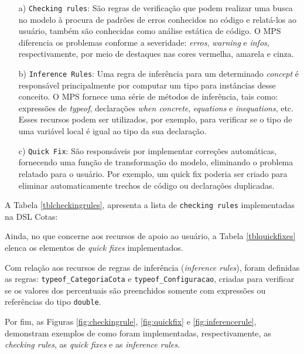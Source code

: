 \begin{enumerate}
 
 \item[a)] \texttt{Checking rules}: São regras de verificação que podem realizar uma busca no modelo à procura de padrões de erros conhecidos no código e relatá-los ao usuário, também são conhecidas como análise estática de código. O \gls{MPS} diferencia os problemas conforme a severidade: \textit{erros}, \textit{warning} e \textit{infos}, respectivamente, por meio de destaques nas cores vermelha, amarela e cinza.
 
 \item[b)]\texttt{Inference Rules}: Uma regra de inferência para um determinado \textit{concept} é responsável principalmente por computar um tipo para instâncias desse conceito. O \gls{MPS} fornece uma série de métodos de inferência, tais como: expressões de \textit{typeof}, declarações \textit{when concrete}, \textit{equations} e \textit{inequations}, etc. Esses recursos podem ser utilizados, por exemplo, para verificar se o tipo de uma variável local é igual ao tipo da sua declaração.
 
 \item[c)]\texttt{Quick Fix}: São responsáveis por implementar correções automáticas, fornecendo uma função de transformação do modelo, eliminando o problema relatado para o usuário. Por exemplo, um quick fix poderia ser criado para eliminar automaticamente trechos de código ou declarações duplicadas.
\end{enumerate}


A Tabela \ref{tblcheckingrules}, apresenta a lista de \texttt{checking rules} implementadas na DSL Cotas:



Ainda, no que concerne aos recursos de apoio ao usuário, a Tabela \ref{tblquickfixes} elenca os elementos de \textit{quick fixes} implementados.



Com relação aos recursos de regras de inferência (\textit{inference rules}), foram definidas as regras: \texttt{typeof\_CategoriaCota} e \texttt{typeof\_Configuracao}, criadas para verificar se os valores dos percentuais são preenchidos somente com expressões ou referências do tipo \texttt{double}.

Por fim, as Figuras \ref{fig:checkingrule}, \ref{fig:quickfix} e \ref{fig:inferencerule}, demonstram exemplos de como foram implementadas, respectivamente, as \textit{checking rules}, as \textit{quick fixes} e as \textit{inference rules}. 

